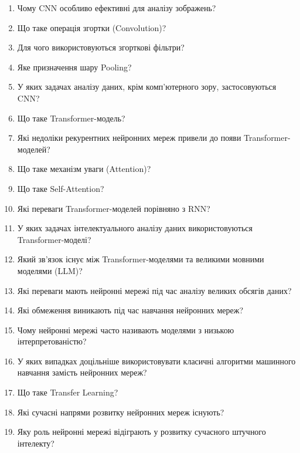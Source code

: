 \begin{enumerate}
\item Чому CNN особливо ефективні для аналізу зображень?
\item Що таке операція згортки (Convolution)?
\item Для чого використовуються згорткові фільтри?
\item Яке призначення шару Pooling?
\item У яких задачах аналізу даних, крім комп'ютерного зору, застосовуються CNN?
\item Що таке Transformer-модель?
\item Які недоліки рекурентних нейронних мереж привели до появи Transformer-моделей?
\item Що таке механізм уваги (Attention)?
\item Що таке Self-Attention?
\item Які переваги Transformer-моделей порівняно з RNN?
\item У яких задачах інтелектуального аналізу даних використовуються Transformer-моделі?
\item Який зв'язок існує між Transformer-моделями та великими мовними моделями (LLM)?
\item Які переваги мають нейронні мережі під час аналізу великих обсягів даних?
\item Які обмеження виникають під час навчання нейронних мереж?
\item Чому нейронні мережі часто називають моделями з низькою інтерпретованістю?
\item У яких випадках доцільніше використовувати класичні алгоритми машинного навчання замість нейронних мереж?
\item Що таке Transfer Learning?
\item Які сучасні напрями розвитку нейронних мереж існують?
\item Яку роль нейронні мережі відіграють у розвитку сучасного штучного інтелекту?
\end{enumerate}